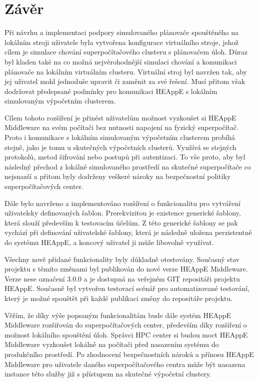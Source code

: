 \chapter{Závěr}
Při návrhu a implementaci podpory simulovaného plánovače spouštěného na lokálním stroji uživatele byla vytvořena konfigurace virtuálního stroje, jehož cílem je simulace chování superpočítačového clusteru s plánovačem úloh. Důraz byl kladen také na co možná nejvěrohodnější simulaci chování a komunikaci plánovače na lokálním virtuálním clusteru. Virtuální stroj byl navržen tak, aby jej uživatel mohl jednoduše upravit či zaměnit za své řešení. Musí přitom však dodržovat předepsané podmínky pro komunikaci HEAppE s lokálním simulovaným výpočetním clusterem.

Cílem tohoto rozšíření je přinést uživatelům možnost vyzkoušet si HEAppE Middleware na svém počítači bez nutnosti napojení na fyzický superpočítač. Proto i komunikace s lokálním simulovaným výpočetním clusterem probíhá stejně, jako je tomu u skutečných výpočetních clusterů. Využívá se stejných protokolů, metod šifrování nebo postupů při autentizaci. To vše proto, aby byl následný přechod z lokálně simulovaného prostředí na skutečné superpočítače co nejsnazší a přitom byly dodrženy veškeré nároky na bezpečnostní politiky superpočítačových center.

Dále bylo navrženo a implementováno rozšíření o funkcionalitu pro vytváření uživatelsky definovaných šablon. Prerekvizitou je existence generické šablony, která slouží především k testovacím účelům. Z této generické šablony se pak vychází při definování uživatelské šablony, která je následně uložena perzistentně do systému HEAppE, a koncový uživatel ji může libovolně využívat.

Všechny nově přidané funkcionality byly důkladně otestovány. Současný stav projektu s těmito změnami byl publikován do nové verze HEAppE Middleware. Verze nese označení 3.0.0 a je dostupná na veřejném GIT repositáři projektu HEAppE. Současně byl vytvořen testovací scénář pro automatizované testování, který je možné spouštět při každé publikaci změny do repositáře projektu.

Věřím, že díky výše popsaným funkcionalitám bude dále systém HEAppE Middleware rozšiřován do superpočítačových center, především díky rozšíření o možnost lokálního spouštění úloh. Správci HPC center si budou moct HEAppE Middleware vyzkoušet lokálně na počítači před nasazením systému do produkčního prostředí. Po zhodnocení bezpečnostních nároků a přínosu HEAppE Middleware pro uživatele daného superpočítačového centra může být nasazena instance této služby již s přístupem na skutečné výpočetní clustery.
\endinput